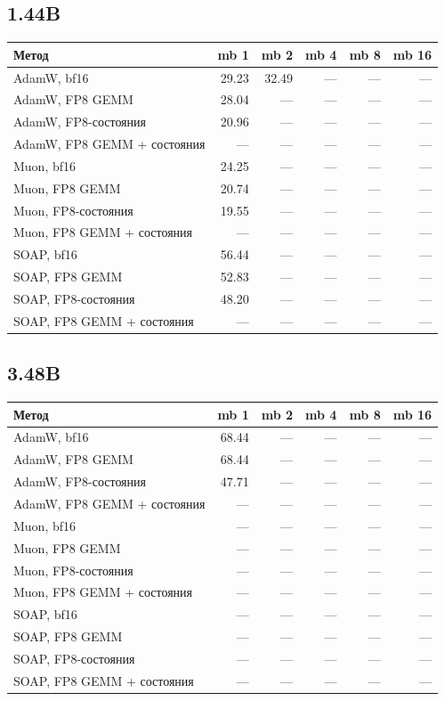 \documentclass[10pt]{article}
\begin{document}
\subsection{1.44B}
\begin{center}
\small
\begin{tabular}{lrrrrr}
\toprule
\textbf{Метод} & \textbf{mb 1} & \textbf{mb 2} & \textbf{mb 4} & \textbf{mb 8} & \textbf{mb 16} \\
\midrule
AdamW, bf16 & 29.23 & 32.49 & --- & --- & --- \\
AdamW, FP8 GEMM & 28.04 & --- & --- & --- & --- \\
AdamW, FP8-состояния & 20.96 & --- & --- & --- & --- \\
AdamW, FP8 GEMM + состояния & --- & --- & --- & --- & --- \\
Muon, bf16 & 24.25 & --- & --- & --- & --- \\
Muon, FP8 GEMM & 20.74 & --- & --- & --- & --- \\
Muon, FP8-состояния & 19.55 & --- & --- & --- & --- \\
Muon, FP8 GEMM + состояния & --- & --- & --- & --- & --- \\
SOAP, bf16 & 56.44 & --- & --- & --- & --- \\
SOAP, FP8 GEMM & 52.83 & --- & --- & --- & --- \\
SOAP, FP8-состояния & 48.20 & --- & --- & --- & --- \\
SOAP, FP8 GEMM + состояния & --- & --- & --- & --- & --- \\
\bottomrule
\end{tabular}
\end{center}
\subsection{3.48B}
\begin{center}
\small
\begin{tabular}{lrrrrr}
\toprule
\textbf{Метод} & \textbf{mb 1} & \textbf{mb 2} & \textbf{mb 4} & \textbf{mb 8} & \textbf{mb 16} \\
\midrule
AdamW, bf16 & 68.44 & --- & --- & --- & --- \\
AdamW, FP8 GEMM & 68.44 & --- & --- & --- & --- \\
AdamW, FP8-состояния & 47.71 & --- & --- & --- & --- \\
AdamW, FP8 GEMM + состояния & --- & --- & --- & --- & --- \\
Muon, bf16 & --- & --- & --- & --- & --- \\
Muon, FP8 GEMM & --- & --- & --- & --- & --- \\
Muon, FP8-состояния & --- & --- & --- & --- & --- \\
Muon, FP8 GEMM + состояния & --- & --- & --- & --- & --- \\
SOAP, bf16 & --- & --- & --- & --- & --- \\
SOAP, FP8 GEMM & --- & --- & --- & --- & --- \\
SOAP, FP8-состояния & --- & --- & --- & --- & --- \\
SOAP, FP8 GEMM + состояния & --- & --- & --- & --- & --- \\
\bottomrule
\end{tabular}
\end{center}
\end{document}

